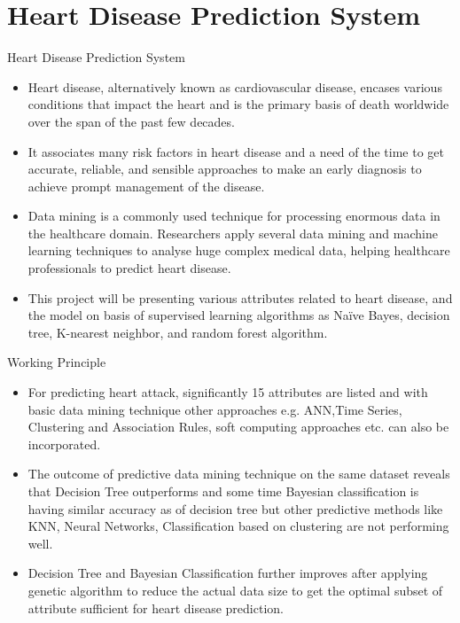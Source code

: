 \documentclass{SKP-beamer}
\begin{document}
\section{\textbf{Heart Disease Prediction System}}

\begin{frame}{Heart Disease Prediction System}
	\begin{itemize}
		\item Heart disease, alternatively known as cardiovascular disease, encases various conditions that impact the heart and is the primary basis of death worldwide over the span of the past few decades.
		\item  It associates many risk factors in heart disease and a need of the time to get accurate, reliable, and sensible approaches to make an early diagnosis to achieve prompt management of the disease. 
		\item Data mining is a commonly used technique for processing enormous data in the healthcare domain. Researchers apply several data mining and machine learning techniques to analyse huge complex medical data, helping healthcare professionals to predict heart disease. 
		\item This project will be presenting various attributes related to heart disease, and the model on basis of supervised learning algorithms as Naïve Bayes, decision tree, K-nearest neighbor, and random forest algorithm.
	\end{itemize}
\end{frame}

\begin{frame}{Working Principle}
	\begin{itemize}
		\item For predicting heart attack, significantly 15 attributes are listed
		and with basic data mining technique other approaches e.g. ANN,Time Series, Clustering and Association Rules, soft computing approaches etc. can also be incorporated. 
		\item The outcome of predictive data mining technique on the same dataset reveals that
		Decision Tree outperforms and some time Bayesian classification is having similar accuracy as of decision tree but other predictive methods like KNN, Neural Networks, Classification based on clustering are not performing well.
		\item Decision Tree and Bayesian Classification further improves after applying genetic algorithm to reduce the actual data size to get the optimal subset of attribute sufficient for heart disease prediction.
	\end{itemize}
\end{frame}
\end{document}
